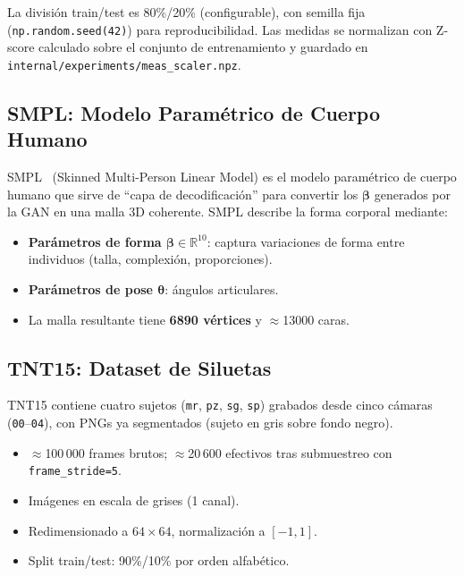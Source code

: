 \documentclass[a4paper,11pt]{article}
\begin{document}
La división train/test es 80\%/20\% (configurable), con semilla fija
(\texttt{np.random.seed(42)}) para reproducibilidad. Las medidas se normalizan
con Z-score calculado sobre el conjunto de entrenamiento y guardado en
\texttt{internal/experiments/meas\_scaler.npz}.

\subsection{SMPL: Modelo Paramétrico de Cuerpo Humano}

SMPL~\cite{loper2015} (Skinned Multi-Person Linear Model) es el modelo
paramétrico de cuerpo humano que sirve de ``capa de decodificación'' para
convertir los $\bm{\beta}$ generados por la GAN en una malla 3D coherente.
SMPL describe la forma corporal mediante:

\begin{itemize}
    \item \textbf{Parámetros de forma $\bm{\beta} \in \mathbb{R}^{10}$}: captura
          variaciones de forma entre individuos (talla, complexión, proporciones).
    \item \textbf{Parámetros de pose $\bm{\theta}$}: ángulos articulares.
    \item La malla resultante tiene \textbf{6890 vértices} y $\approx$13000 caras.
\end{itemize}

\subsection{TNT15: Dataset de Siluetas}

TNT15 contiene cuatro sujetos (\texttt{mr}, \texttt{pz}, \texttt{sg},
\texttt{sp}) grabados desde cinco cámaras (\texttt{00}–\texttt{04}), con
PNGs ya segmentados (sujeto en gris sobre fondo negro).

\begin{itemize}
    \item $\approx$100\,000 frames brutos; $\approx$20\,600 efectivos tras
          submuestreo con \texttt{frame\_stride=5}.
    \item Imágenes en escala de grises (1 canal).
    \item Redimensionado a $64\times64$, normalización a $[-1,1]$.
    \item Split train/test: 90\%/10\% por orden alfabético.
\end{itemize}

\end{document}
